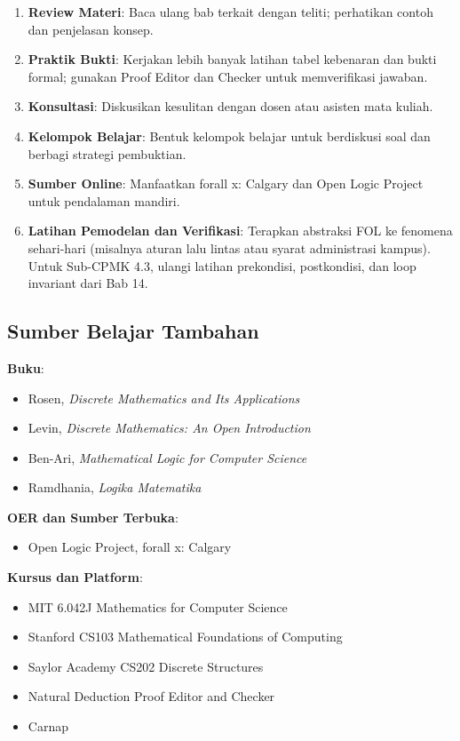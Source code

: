 \begin{enumerate}
  \item \textbf{Review Materi}: Baca ulang bab terkait dengan teliti; perhatikan contoh dan penjelasan konsep.
  \item \textbf{Praktik Bukti}: Kerjakan lebih banyak latihan tabel kebenaran dan bukti formal; gunakan Proof Editor dan Checker \cite{proofs_checker} untuk memverifikasi jawaban.
  \item \textbf{Konsultasi}: Diskusikan kesulitan dengan dosen atau asisten mata kuliah.
  \item \textbf{Kelompok Belajar}: Bentuk kelompok belajar untuk berdiskusi soal dan berbagi strategi pembuktian.
  \item \textbf{Sumber Online}: Manfaatkan forall x: Calgary \cite{forallx} dan Open Logic Project untuk pendalaman mandiri.
  \item \textbf{Latihan Pemodelan dan Verifikasi}: Terapkan abstraksi FOL ke fenomena sehari-hari (misalnya aturan lalu lintas atau syarat administrasi kampus). Untuk Sub-CPMK 4.3, ulangi latihan prekondisi, postkondisi, dan loop invariant dari Bab 14.
\end{enumerate}

\subsection{Sumber Belajar Tambahan}

\textbf{Buku}:
\begin{itemize}
  \item Rosen, \textit{Discrete Mathematics and Its Applications} \cite{rosen2019}
  \item Levin, \textit{Discrete Mathematics: An Open Introduction} \cite{levin_discrete}
  \item Ben-Ari, \textit{Mathematical Logic for Computer Science} \cite{benari_matlogic}
  \item Ramdhania, \textit{Logika Matematika} \cite{ramdhania2023}
\end{itemize}

\textbf{OER dan Sumber Terbuka}:
\begin{itemize}
  \item Open Logic Project, forall x: Calgary \cite{openlogic,forallx}
\end{itemize}

\textbf{Kursus dan Platform}:
\begin{itemize}
  \item MIT 6.042J Mathematics for Computer Science \cite{mit_6042}
  \item Stanford CS103 Mathematical Foundations of Computing \cite{stanford_cs103}
  \item Saylor Academy CS202 Discrete Structures \cite{saylor_cs202}
  \item Natural Deduction Proof Editor and Checker \cite{proofs_checker}
  \item Carnap \cite{carnap}
\end{itemize}
